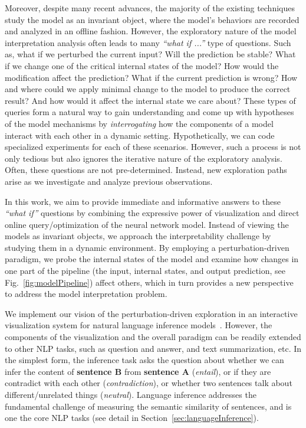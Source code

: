 Moreover, despite many recent advances, the majority of the existing techniques study the model as an invariant object, where the model's behaviors are recorded and analyzed in an offline fashion.
%
However, the exploratory nature of the model interpretation analysis often leads to many \emph{``what if ...''} type of questions. Such as, what if we perturbed the current input? Will the prediction be stable? What if we change one of the critical internal states of the model? How would the modification affect the prediction? What if the current prediction is wrong? How and where could we apply minimal change to the model to produce the correct result? And how would it affect the internal state we care about? These types of queries form a natural way to gain understanding and come up with hypotheses of the model mechanisms by \emph{interrogating} how the components of a model interact with each other in a dynamic setting. Hypothetically, we can code specialized experiments for each of these scenarios. However, such a process is not only tedious but also ignores the iterative nature of the exploratory analysis. Often, these questions are not pre-determined. Instead, new exploration paths arise as we investigate and analyze previous observations.

In this work, we aim to provide immediate and informative answers to these \emph{``what if''} questions by combining the expressive power of visualization and direct online query/optimization of the neural network model. Instead of viewing the models as invariant objects, we approach the interpretability challenge by studying them in a dynamic environment. By employing a perturbation-driven paradigm, we probe the internal states of the model and examine how changes in one part of the pipeline (the input, internal states, and output prediction, see Fig.~\ref{fig:modelPipeline}) affect others, which in turn provides a new perspective to address the model interpretation problem.

We implement our vision of the perturbation-driven exploration in an interactive visualization system for natural language inference models~\cite{Parikh2016}.
However, the components of the visualization and the overall paradigm can be readily extended to other NLP tasks, such as question and answer, and text summarization, etc.
%
In the simplest form, the inference task asks the question about whether we can infer the content of \textbf{sentence B} from \textbf{sentence A} (\emph{entail}), or if they are contradict with each other (\emph{contradiction}), or whether two sentences talk about different/unrelated things (\emph{neutral}). Language inference addresses the fundamental challenge of measuring the semantic similarity of sentences, and is one the core NLP tasks (see detail in Section~\ref{sec:languageInference}).

